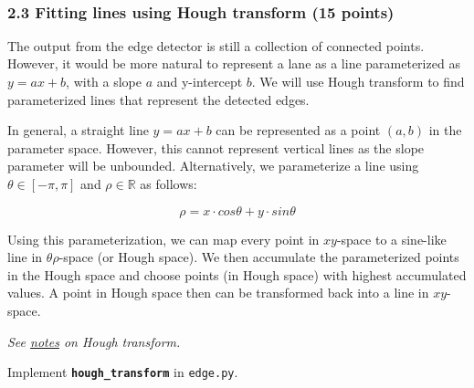 \documentclass[11pt]{article}
\begin{document}
    \begin{center}
    \end{center}
    { \hspace*{\fill} \\}
    
    \hypertarget{fitting-lines-using-hough-transform-15-points}{%
\subsubsection{2.3 Fitting lines using Hough transform (15
points)}\label{fitting-lines-using-hough-transform-15-points}}

The output from the edge detector is still a collection of connected
points. However, it would be more natural to represent a lane as a line
parameterized as \(y = ax + b\), with a slope \(a\) and y-intercept
\(b\). We will use Hough transform to find parameterized lines that
represent the detected edges.

In general, a straight line \(y = ax + b\) can be represented as a point
\((a, b)\) in the parameter space. However, this cannot represent
vertical lines as the slope parameter will be unbounded. Alternatively,
we parameterize a line using \(\theta\in{[-\pi, \pi]}\) and
\(\rho\in{\mathbb{R}}\) as follows:

\[
\rho = x\cdot{cos\theta} + y\cdot{sin\theta}
\]

Using this parameterization, we can map every point in \(xy\)-space to a
sine-like line in \(\theta\rho\)-space (or Hough space). We then
accumulate the parameterized points in the Hough space and choose points
(in Hough space) with highest accumulated values. A point in Hough space
then can be transformed back into a line in \(xy\)-space.

\emph{See
\href{http://web.ipac.caltech.edu/staff/fmasci/home/astro_refs/HoughTrans_lines_09.pdf}{notes}
on Hough transform.}

Implement \textbf{\texttt{hough\_transform}} in \texttt{edge.py}.
\end{document}
